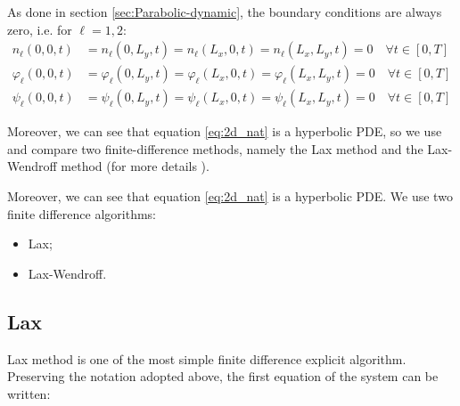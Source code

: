 As done in section \ref{sec:Parabolic-dynamic}, the boundary conditions
are always zero, i.e. for $\ell=1,2$:
\begin{align*}
n_{\ell}\left(0,0,t\right) & =n_{\ell}\left(0,L_{y},t\right)=n_{\ell}\left(L_{x},0,t\right)=n_{\ell}\left(L_{x},L_{y},t\right)=0\quad\forall t\in\left[0,T\right]\\
\varphi_{\ell}\left(0,0,t\right) & =\varphi_{\ell}\left(0,L_{y},t\right)=\varphi_{\ell}\left(L_{x},0,t\right)=\varphi_{\ell}\left(L_{x},L_{y},t\right)=0\quad\forall t\in\left[0,T\right]\\
\psi_{\ell}\left(0,0,t\right) & =\psi_{\ell}\left(0,L_{y},t\right)=\psi_{\ell}\left(L_{x},0,t\right)=\psi_{\ell}\left(L_{x},L_{y},t\right)=0\quad\forall t\in\left[0,T\right]
\end{align*}

Moreover, we can see that equation \ref{eq:2d_nat} is a hyperbolic
PDE, so we use and compare two finite-difference methods, namely the
Lax method and the Lax-Wendroff method (for more details \cite{ames_numerical_1992,press_numerical_2007,pang_introduction_2006,thomas1995numerical,thomas1999numerical}).

Moreover, we can see that equation \ref{eq:2d_nat} is a hyperbolic
PDE. We use two finite difference algorithms:
\begin{itemize}
\item Lax;
\item Lax-Wendroff.
\end{itemize}

\subsection{Lax}

Lax method \cite{press_numerical_2007} is one of the most simple
finite difference explicit algorithm. Preserving the notation adopted
above, the first equation of the system can be written:

